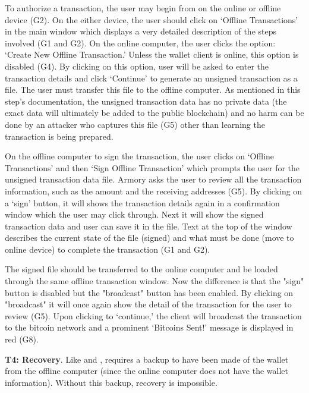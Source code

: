 To authorize a transaction, the user may begin from \armory on the online or offline device (G2). On the either device, the user should click on `Offline Transactions' in the main window which displays a very detailed description of the steps involved (G1 and G2). On the online computer, the user clicks the option: `Create New Offline Transaction.' Unless the wallet client is online, this option is disabled (G4). By clicking on this option, user will be asked to enter the transaction details and click `Continue' to generate an unsigned transaction as a file. The user must transfer this file to the offline computer. As mentioned in this step's documentation, the unsigned transaction data has no private data (the exact data will ultimately be added to the public blockchain) and no harm can be done by an attacker who captures this file (G5) other than learning the transaction is being prepared.

On the offline computer to sign the transaction, the user clicks on `Offline Transactions' and then `Sign Offline Transaction' which prompts the user for the unsigned transaction data file. Armory asks the user to review all the transaction information, such as the amount and the receiving addresses (G5). By clicking on a `sign' button, it will shows the transaction details again in a confirmation window which the user may click through. Next it will show the signed transaction data and user can save it in the file. Text at the top of the window describes the current state of the file (signed) and what must be done (move to online device) to complete the transaction (G1 and G2).

The signed file should be transferred to the online computer and be loaded through the same offline transaction window. Now the difference is that the "sign" button is disabled but the "broadcast" button has been enabled. By clicking on "broadcast" it will once again show the detail of the transaction for the user to review (G5). Upon clicking to `continue,' the client will broadcast the transaction to the bitcoin network and a prominent `Bitcoins Sent!' message is displayed in red (G8).

\textbf{T4: Recovery}.
Like \bitcoinclient and \multibit, \armory requires a backup to have been made of the wallet from the offline computer (since the online computer does not have the wallet information). Without this backup, recovery is impossible.

